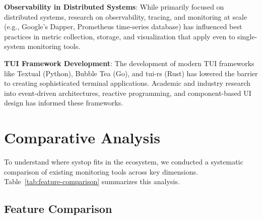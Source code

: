 \documentclass[12pt,a4paper,oneside]{report}
\begin{document}
\textbf{Observability in Distributed Systems}: While primarily focused on distributed systems, research on observability, tracing, and monitoring at scale (e.g., Google's Dapper, Prometheus time-series database) has influenced best practices in metric collection, storage, and visualization that apply even to single-system monitoring tools.

\textbf{TUI Framework Development}: The development of modern TUI frameworks like Textual (Python), Bubble Tea (Go), and tui-rs (Rust) has lowered the barrier to creating sophisticated terminal applications. Academic and industry research into event-driven architectures, reactive programming, and component-based UI design has informed these frameworks.

\section{Comparative Analysis}
\label{sec:comparative-analysis}

To understand where systop fits in the ecosystem, we conducted a systematic comparison of existing monitoring tools across key dimensions. Table~\ref{tab:feature-comparison} summarizes this analysis.

\subsection{Feature Comparison}
\end{document}
